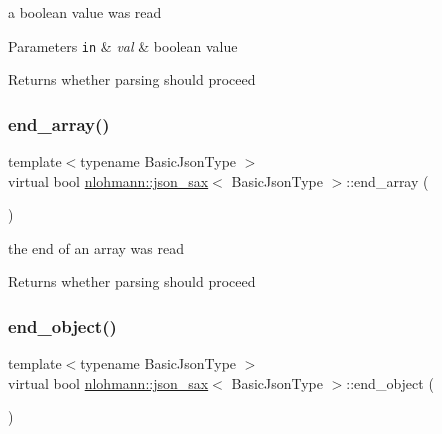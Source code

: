 a boolean value was read 


\begin{DoxyParams}[1]{Parameters}
\mbox{\tt in}  & {\em val} & boolean value \\
\hline
\end{DoxyParams}
\begin{DoxyReturn}{Returns}
whether parsing should proceed 
\end{DoxyReturn}
\mbox{\label{structnlohmann_1_1json__sax_a235ee975617f28e6a996d1e36a282312}} 
\subsubsection{\texorpdfstring{end\+\_\+array()}{end\_array()}}
{\footnotesize\ttfamily template$<$typename Basic\+Json\+Type $>$ \\
virtual bool \hyperlink{structnlohmann_1_1json__sax}{nlohmann\+::json\+\_\+sax}$<$ Basic\+Json\+Type $>$\+::end\+\_\+array (\begin{DoxyParamCaption}{ }\end{DoxyParamCaption})\hspace{0.3cm}{\ttfamily [pure virtual]}}



the end of an array was read 

\begin{DoxyReturn}{Returns}
whether parsing should proceed 
\end{DoxyReturn}
\mbox{\label{structnlohmann_1_1json__sax_ad0c722d53ff97be700ccf6a9468bd456}} 
\subsubsection{\texorpdfstring{end\+\_\+object()}{end\_object()}}
{\footnotesize\ttfamily template$<$typename Basic\+Json\+Type $>$ \\
virtual bool \hyperlink{structnlohmann_1_1json__sax}{nlohmann\+::json\+\_\+sax}$<$ Basic\+Json\+Type $>$\+::end\+\_\+object (\begin{DoxyParamCaption}{ }\end{DoxyParamCaption})\hspace{0.3cm}{\ttfamily [pure virtual]}}




